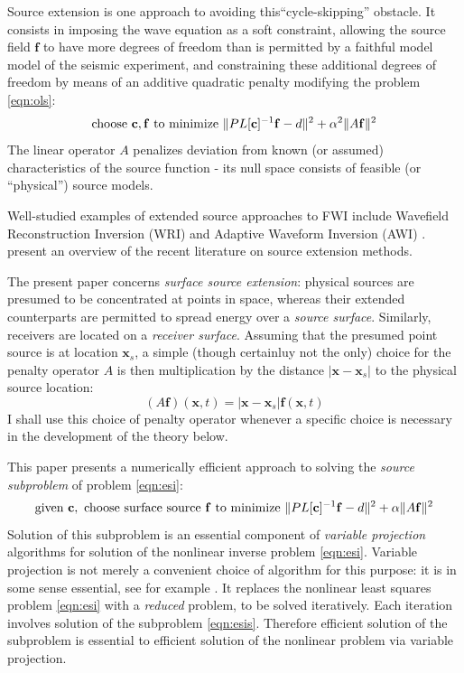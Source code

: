 \documentclass[georeport,12pt]{geophysics}
\newcommand{\bx}{\mathbf{x}}
\newcommand{\bff}{\mathbf{f}}
\begin{document}
Source extension is one approach to avoiding this``cycle-skipping''
obstacle. It consists in imposing the wave equation as a soft
constraint, allowing the source field $\bff$ to have more degrees of
freedom than is permitted by a faithful model model of the seismic
experiment, and constraining these additional degrees of freedom by
means of an additive quadratic penalty modifying the problem
\ref{eqn:ols}:
\begin{equation}
\label{eqn:esi}
\mbox{choose } {\bf c}, \bff \mbox{ to minimize } \|PL[{\bf c}]^{-1}\bff -d \|^2 + \alpha^2 \|A\bff\|^2 
\end{equation}
The linear operator $A$ penalizes deviation from known (or assumed)
characteristics of the source function - its null space consists of
feasible (or ``physical'') source models.

Well-studied examples of extended source approaches to FWI include
Wavefield Reconstruction Inversion (WRI)  \cite[]{LeeuwenHerrmannWRI:13,LeeuwenHerrmann:16,Lietal:18,Aghmiryetal:20,Louboutinetal:20} and Adaptive Waveform
Inversion (AWI)
\cite[]{Warner:16,GuachWarnerRavaut:GEO19,Guaschetal:NPJDM20,Yongetal:EAGE21,Warneretal:SEG21}. \cite{HuangNammourSymesDollizal:SEG19}
present an overview of the recent
literature on source extension methods.

The present paper concerns {\em surface source extension}: physical
sources are presumed to be concentrated at points in space, whereas
their extended counterparts are permitted to spread energy over a {\em
  source surface}. Similarly, receivers are located on a {\em receiver
  surface}. Assuming that the presumed point source is at location
$\bx_s$, a simple (though certainluy not the only) choice for the
penalty operator $A$ is then multiplication by the distance
$|\bx-\bx_s|$ to the physical source location:
\begin{equation}
  \label{eqn:penop}
  (A\bff)(\bx,t) = |\bx-\bx_s|\bff(\bx,t)
\end{equation}
I shall use this choice of penalty operator whenever a specific choice
is necessary in the development of the theory below.

This paper presents a numerically efficient approach to solving the
{\em source subproblem} of problem \ref{eqn:esi}:
\begin{equation}
\label{eqn:esis}
\mbox{given } {\bf c}, \mbox{ choose surface source } \bff \mbox{ to minimize }
\|PL[{\bf c}]^{-1}\bff -d \|^2 + \alpha \|A\bff\|^2 
\end{equation}
Solution of this subproblem is an essential component of {\em variable
  projection} algorithms for solution of the nonlinear inverse problem
\ref{eqn:esi}. Variable projection is not merely a convenient choice
of algorithm for this purpose: it is in some sense essential, see for
example \cite{Symes:SEG20}. It replaces the nonlinear
least squares problem \ref{eqn:esi} with a {\em reduced} problem, to
be solved iteratively. Each iteration involves solution of the
subproblem \ref{eqn:esis}. Therefore efficient solution of the
subproblem is essential to efficient solution of the nonlinear problem
via variable projection.
\end{document}
